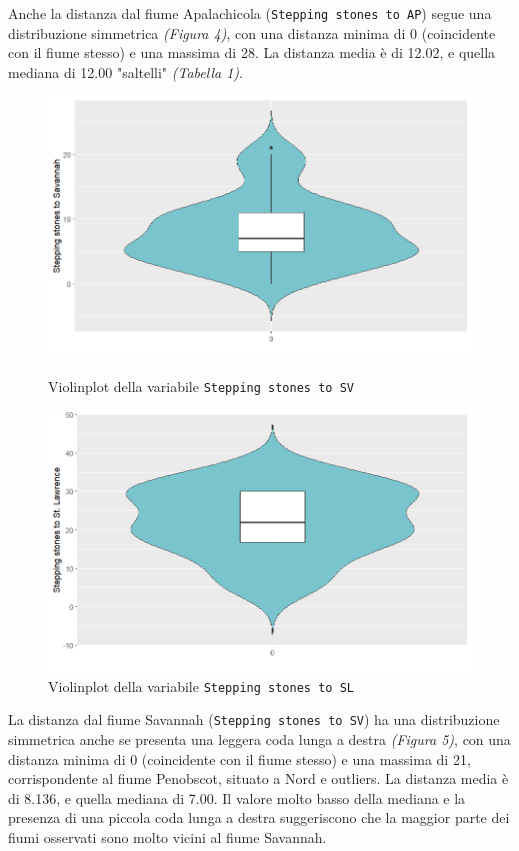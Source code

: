 \documentclass{article} %
\begin{document}
Anche la distanza dal fiume Apalachicola (\texttt{Stepping stones to AP}) segue una distribuzione simmetrica \textit{(Figura 4)}, con una distanza minima di 0 (coincidente con il fiume stesso) e una massima di 28. La distanza media è di 12.02, e quella mediana di 12.00 "saltelli" \textit{(Tabella 1)}.

\begin{figure}[H]
    \centering
    \begin{minipage}{0.49\textwidth}
        \centering
        \includegraphics[width=\textwidth]{immagini/vp_sv.png}
        \captionsetup{justification=centering}
        \caption{Violinplot della variabile \texttt{Stepping stones to SV}}
    \end{minipage}
    \hfill
    \begin{minipage}{0.49\textwidth}
        \centering
        \includegraphics[width=\textwidth]{immagini/vp_sl.png}
        \captionsetup{justification=centering}
        \caption{Violinplot della variabile \texttt{Stepping stones to SL}}
    \end{minipage}
\end{figure}
La distanza dal fiume Savannah (\texttt{Stepping stones to SV}) ha una distribuzione simmetrica anche se presenta una leggera coda lunga a destra \textit{(Figura 5)}, con una distanza minima di 0 (coincidente con il fiume stesso) e una massima di 21, corrispondente al fiume Penobscot, situato a Nord e outliers. La distanza media è di 8.136, e quella mediana di 7.00. Il valore molto basso della mediana e la presenza di una piccola coda lunga a destra suggeriscono che la maggior parte dei fiumi osservati sono molto vicini al fiume Savannah.
\end{document}
